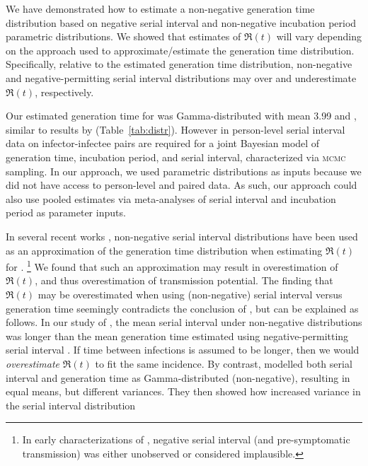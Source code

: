 We have demonstrated how to estimate
a non-negative generation time distribution
based on negative serial interval
and non-negative incubation period parametric distributions.
We showed that estimates of $\Re(t)$ will vary depending on
the approach used to approximate/estimate the generation time distribution.
Specifically, relative to the estimated generation time distribution,
non-negative and negative-permitting serial interval distributions
may over and underestimate $\Re(t)$, respectively.
\par
Our estimated generation time for \covid was
Gamma-distributed with mean 3.99 and ,
similar to results by \textcite{Ganyani2020} (Table~\ref{tab:distr}).
However in \cite{Ganyani2020}
person-level serial interval data on infector-infectee pairs
are required for a joint Bayesian model of
generation time, incubation period, and serial interval,
characterized via \textsc{mcmc} sampling.
In our approach, we used parametric distributions as inputs
because we did not have access to 
person-level and paired data.
As such, our approach could also use pooled estimates via meta-analyses of
serial interval and incubation period as parameter inputs.
\par
In several recent works \cite{You2020,Tang2020,Zhang2020a,Zhang2020},
non-negative serial interval distributions have been used
as an approximation of the generation time distribution
when estimating $\Re(t)$ for \covid.%
\footnote{In early characterizations of \covid
  \cite{Li2020,Zhang2020,Nishiura2020,Zhao2020,You2020},
  negative serial interval (and pre-symptomatic transmission)
  was either unobserved or considered implausible.}
We found that such an approximation may result in
overestimation of $\Re(t)$,
and thus overestimation of \covid transmission potential.
The finding that $\Re(t)$ may be overestimated
when using (non-negative) serial interval versus generation time
seemingly contradicts the conclusion of \textcite{Britton2019},
but can be explained as follows.
In our study of \covid,
the mean serial interval under non-negative distributions \cite{Zhang2020,Nishiura2020}
was longer than the mean generation time
estimated using negative-permitting serial interval \cite{Du2020}.
If time between infections is assumed to be longer,
then we would \emph{overestimate} $\Re(t)$ to fit the same incidence.
By contrast, \textcite{Britton2019} modelled
both serial interval and generation time as Gamma-distributed (non-negative),
resulting in equal means, but different variances.
They then showed how increased variance in the serial interval distribution
